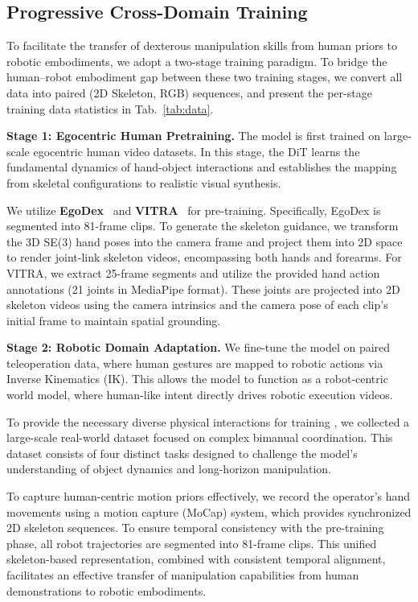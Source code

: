 \subsection{Progressive Cross-Domain Training}
\label{sec:method:training}
To facilitate the transfer of dexterous manipulation skills from human priors to robotic embodiments, we adopt a two-stage training paradigm.
To bridge the human–robot embodiment gap between these two training stages, we convert all data into paired (2D Skeleton, RGB) sequences, and present the per-stage training data statistics in Tab.~\ref{tab:data}.

\noindent 
\textbf{Stage 1: Egocentric Human Pretraining.} The model is first trained on large-scale egocentric human video datasets. In this stage, the DiT learns the fundamental dynamics of hand-object interactions and establishes the mapping from skeletal configurations to realistic visual synthesis.

We utilize \textbf{EgoDex}~\citep{hoque2025egodex} and \textbf{VITRA}~\citep{li2025scalable} for pre-training. Specifically, EgoDex is segmented into 81-frame clips. To generate the skeleton guidance, we transform the 3D SE(3) hand poses into the camera frame and project them into 2D space to render joint-link skeleton videos, encompassing both hands and forearms. For VITRA, we extract 25-frame segments and utilize the provided hand action annotations (21 joints in MediaPipe format). These joints are projected into 2D skeleton videos using the camera intrinsics and the camera pose of each clip's initial frame to maintain spatial grounding.

\noindent 
\textbf{Stage 2: Robotic Domain Adaptation.} We fine-tune the model on paired teleoperation data, where human gestures are mapped to robotic actions via Inverse Kinematics (IK). This allows the model to function as a robot-centric world model, where human-like intent directly drives robotic execution videos. 

To provide the necessary diverse physical interactions for training \our, we collected a large-scale real-world dataset focused on complex bimanual coordination. This dataset consists of four distinct tasks designed to challenge the model's understanding of object dynamics and long-horizon manipulation. 

To capture human-centric motion priors effectively, we record the operator's hand movements using a motion capture (MoCap) system, which provides synchronized 2D skeleton sequences. To ensure temporal consistency with the pre-training phase, all robot trajectories are segmented into 81-frame clips. This unified skeleton-based representation, combined with consistent temporal alignment, facilitates an effective transfer of manipulation capabilities from human demonstrations to robotic embodiments.

